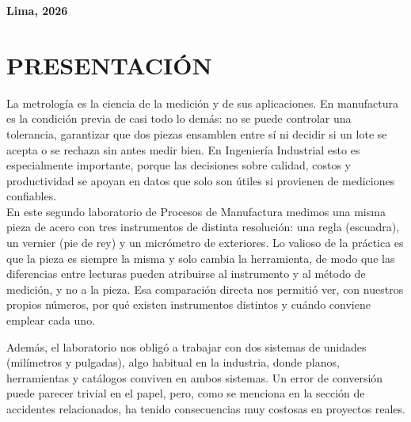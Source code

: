 \documentclass[12pt,a4paper]{article}
\begin{document}
\begin{titlepage}
\begin{center}
		\vspace{1cm}

	\end{center}

	\vfill
	\begin{center}
		{\sffamily\bfseries\color{darkblue}\large Lima, 2026\par}
	\end{center}
\end{titlepage}
\setcounter{page}{2}

\tableofcontents
\newpage

\section{PRESENTACIÓN}

La metrología es la ciencia de la medición y de sus aplicaciones. En manufactura
es la condición previa de casi todo lo demás: no se puede controlar una
tolerancia, garantizar que dos piezas ensamblen entre sí ni decidir si un lote
se acepta o se rechaza sin antes medir bien. En Ingeniería Industrial esto es
especialmente importante, porque las decisiones sobre calidad, costos y
productividad se apoyan en datos que solo son útiles si provienen de
mediciones confiables.\\[-4pt]

En este segundo laboratorio de Procesos de Manufactura medimos una misma pieza
de acero con tres instrumentos de distinta resolución: una regla (escuadra), un
vernier (pie de rey) y un micrómetro de exteriores. Lo valioso de la práctica es
que la pieza es siempre la misma y solo cambia la herramienta, de modo que las
diferencias entre lecturas pueden atribuirse al instrumento y al método de
medición, y no a la pieza. Esa comparación directa nos permitió ver, con
nuestros propios números, por qué existen instrumentos distintos y cuándo
conviene emplear cada uno.\\[-4pt]

\begin{figure}[H]
	\centering
\end{figure}

Además, el laboratorio nos obligó a trabajar con dos sistemas de unidades
(milímetros y pulgadas), algo habitual en la industria, donde planos,
herramientas y catálogos conviven en ambos sistemas. Un error de conversión
puede parecer trivial en el papel, pero, como se menciona en la sección de
accidentes relacionados, ha tenido consecuencias muy costosas en proyectos
reales.
\end{document}
